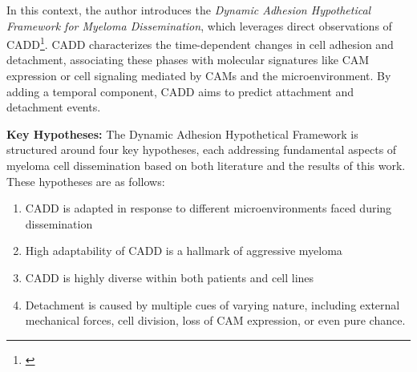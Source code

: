 In this context, the author introduces the \emph{Dynamic Adhesion Hypothetical Framework for
      Myeloma Dissemination}, which leverages direct observations of
\acf{CADD}\footnote{\footcadd\label{foot:cadd}}. \ac{CADD} characterizes
the time-dependent changes in cell adhesion and detachment, associating these
phases with molecular signatures like \ac{CAM} expression or cell signaling
mediated by \acp{CAM} and the microenvironment. By adding a temporal component,
\ac{CADD} aims to predict attachment and detachment events.



\newcommand{\caddadaptation}{ %
      \ac{CADD} is adapted in response to different microenvironments faced
      during dissemination %
}
\newcommand{\caddadaptationtitle}{ %
      \textit{Hypothesis 1}: \ac{CADD} is Adapted during Dissemination%
}%


\newcommand{\caddadaptibility}{ %
      High adaptability of \ac{CADD} is a hallmark of aggressive myeloma %
}%
\newcommand{\caddadaptabilitytitle}{ %
      \textit{Hypothesis 2}: High Adaptability of \ac{CADD} is a Hallmark of
      Aggressive Myeloma %
}%


\newcommand{\cadddiversity}{%
      \ac{CADD} is highly diverse within both patients and cell lines %
}%
\newcommand{\cadddiversitytitle}{ %
      \textit{Hypothesis 3}: \ac{CADD} is Highly Diverse Within both Patients
      and Cell Lines%
}%


\newcommand{\caddtrigger}{%
      Detachment is caused by multiple cues of varying nature, including
      external mechanical forces, cell division, loss of \ac{CAM} expression, or
      even pure chance. }%
\newcommand{\caddtriggertitle}{ %
      \textit{Hypothesis 4}: Detachment is Caused by Multiple Cues of Varying
      Nature %
}%


\textbf{Key Hypotheses:}
The Dynamic Adhesion Hypothetical Framework is structured around four key
hypotheses, each addressing fundamental aspects of myeloma cell dissemination
based on both literature and the results of this work. These hypotheses are as
follows:

\begin{enumerate}[parsep=4pt]
      \item \caddadaptation
      \item \caddadaptibility
      \item \cadddiversity
      \item \caddtrigger
\end{enumerate}


